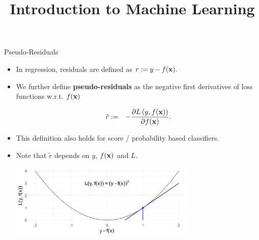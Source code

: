 \documentclass[11pt,compress,t,notes=noshow, xcolor=table]{beamer}
\title{Introduction to Machine Learning}
\begin{document}
    

\begin{vbframe}{Pseudo-Residuals}

\begin{itemize}
	\item In regression, residuals are defined as $
			r := y - f(\mathbf{x}).$
\item We further define \textbf{pseudo-residuals} as the negative first derivatives of loss functions w.r.t. $f(\mathbf{x})$

\vspace*{-0.3cm}
  \begin{eqnarray*}
    \tilde r &:=& - \frac{\partial \Lxy}{\partial \fx}.  %
  \end{eqnarray*}
\item This definition also holds for score / probability based classifiers.
\item Note that $\tilde{r}$ depends on $y$, $f(\mathbf{x})$ and $L$. %

\vfill

\includegraphics[width=0.7\textwidth]{figure/plot_quad_pseudores.png}

\end{itemize}

\end{vbframe}
\end{document}

